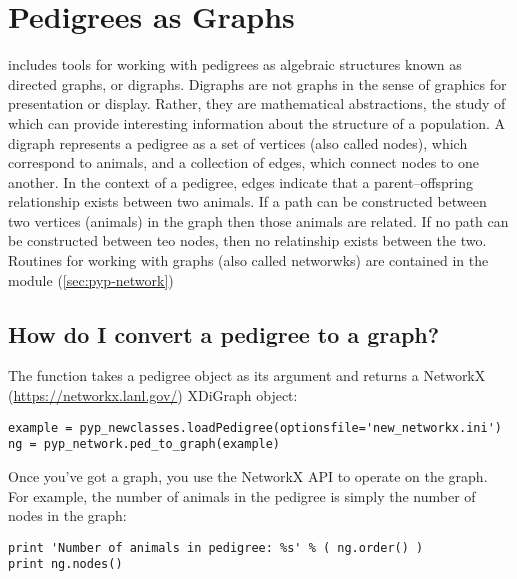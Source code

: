 \section{Pedigrees as Graphs}
\label{sec:howto-pedigrees-graphs}
\PyPedal{} includes tools for working with pedigrees as algebraic structures known as directed graphs, or digraphs. Digraphs are not graphs in the sense of graphics for presentation or display. Rather, they are mathematical abstractions, the study of which can provide interesting information about the structure of a population. A digraph represents a pedigree as a set of vertices (also called nodes), which correspond to animals, and a collection of edges, which connect nodes to one another. In the context of a pedigree, edges indicate that a parent--offspring relationship exists between two animals.  If a path can be constructed between two vertices (animals) in the graph then those animals are related. If no path can be constructed between teo nodes, then no relatinship exists between the two. Routines for working with graphs (also called networwks) are contained in the  module (\ref{sec:pyp-network})
\subsection{How do I convert a pedigree to a graph?}
\label{sec:howto-pedigree-to-graph}
The function  takes a \PyPedal{} pedigree object as its argument and returns a NetworkX (\url{https://networkx.lanl.gov/}) XDiGraph object:
\begin{verbatim}
example = pyp_newclasses.loadPedigree(optionsfile='new_networkx.ini')
ng = pyp_network.ped_to_graph(example)
\end{verbatim}
Once you've got a graph, you use the NetworkX API to operate on the graph. For example, the number of animals in the pedigree is simply the number of nodes in the graph:
\begin{verbatim}
print 'Number of animals in pedigree: %s' % ( ng.order() )
print ng.nodes()
\end{verbatim}
